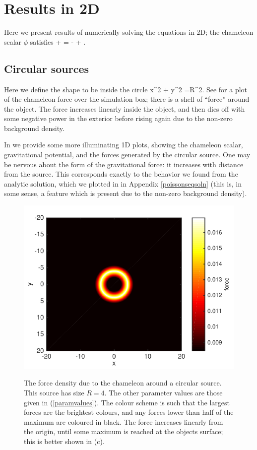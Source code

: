 \documentclass[a4paper, 12pt]{article}
\numberwithin{equation}{section}
\begin{document}
\section{Results in 2D}
\label{sec:resulys_2d}
Here we present results of numerically solving the equations in 2D;  the chameleon scalar $\phi$ satisfies
\bea
{} +  = -  + .
\eea
\subsection{Circular sources}
Here we define the shape to be inside the circle
\bea
x^2 + y^2 =R^2.
\eea
See  for a plot of the chameleon force over the simulation box; there is a shell of ``force'' around the object. The force increases linearly inside the object, and then dies off with some negative power in the exterior before rising again due to the  non-zero background density. 

In  we provide some more illuminating 1D plots, showing the chameleon scalar, gravitational potential, and the forces generated by the circular source. One may be nervous about the form of the gravitational force: it increases with distance from the source. This corresponds exactly to the behavior we found from the analytic solution, which we plotted in  in Appendix \ref{poissonseqsoln} (this is, in some sense, a feature which is present due to the non-zero background density).

\begin{figure}[!t]
      \begin{center}
{\includegraphics[scale=0.8,angle=0]{images/sp_lorho_force_final.pdf}}
      \end{center}
\caption{ The force density due to the chameleon around a circular source. This source has size $R=4$. The other parameter values are those given in (\ref{paramvalues}).   The colour scheme is such that the largest forces are the brightest colours, and any forces lower than half of the maximum are coloured in black.  The force increases linearly from the origin, until some maximum is reached at the objects surface; this is better shown in (c).}\label{fig:circ}
\end{figure}
\end{document}
